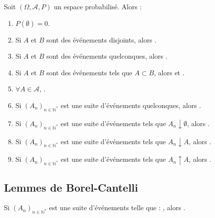 \documentclass[10pt, french]{article}
\begin{document}
\begin{multicols*}{2}
\begin{definitionNOHFILLprop}
Soit $(\Omega, \mathcal{A}, P)$ un espace probabilisé. Alors : 
\begin{enumerate}[label = \alph*)]
	\item	$P(\emptyset) = 0$.
	\item	Si $A$ et $B$ sont des événements disjoints, alors .
	\item	Si $A$ et $B$ sont des événements quelconques, alors .
	\item	Si $A$ et $B$ sont des événements tels que $A \subset B$, alors  et .
	\item	$\forall A \in \mathcal{A}$, .
	\item	Si $(A_{n})_{n \in \mathbb{N}^{\ast}}$ est une suite d'événements quelconques, alors .
	\item	Si $(A_{n})_{n \in \mathbb{N}^{\ast}}$ est une suite d'événements tels que $A_{n} \downarrow \emptyset$, alors .
	\item	Si $(A_{n})_{n \in \mathbb{N}^{\ast}}$ est une suite d'événements tels que $A_{n} \downarrow A$, alors .
	\item	Si $(A_{n})_{n \in \mathbb{N}^{\ast}}$ est une suite d'événements tels que $A_{n} \uparrow A$, alors .
\end{enumerate}
\end{definitionNOHFILLprop}



\columnbreak
\subsection{Lemmes de Borel-Cantelli}
\begin{definitionNOHFILL}
Si $(A_{n})_{n \in \mathbb{N}^{\ast}}$ est une suite d'événements telle que : , alors .
\end{definitionNOHFILL}




\end{multicols*}
\end{document}
